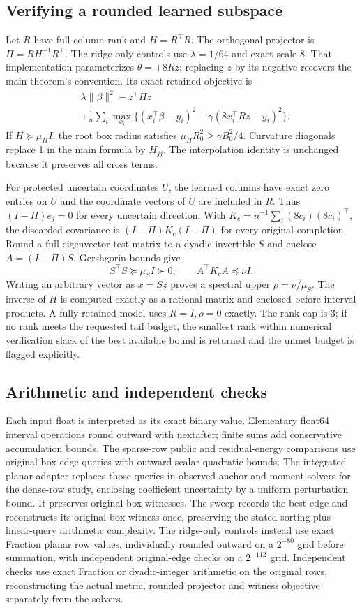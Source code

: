 \subsection{Verifying a rounded learned subspace}
Let $R$ have full column rank and $H=R^\top R$. The orthogonal projector is $\Pi=RH^{-1}R^\top$. The ridge-only controls use $\lambda=1/64$ and exact scale 8. That implementation parameterizes $\theta=+8Rz$; replacing $z$ by its negative recovers the main theorem's convention. Its exact retained objective is
\[
\begin{aligned}
 &\lambda\|\beta\|^2-z^\top Hz\\
 &+\frac1n\sum_i\max_{x_i}\{(x_i^\top\beta-y_i)^2-
              \gamma(8x_i^\top Rz-y_i)^2\}.
\end{aligned}
\]
If $H\succeq\mu_HI$, the root box radius satisfies $\mu_H R_0^2\geq\gamma B_0^2/4$. Curvature diagonals replace 1 in the main formula by $H_{jj}$. The interpolation identity is unchanged because it preserves all cross terms.

For protected uncertain coordinates $U$, the learned columns have exact zero entries on $U$ and the coordinate vectors of $U$ are included in $R$. Thus $(I-\Pi)e_j=0$ for every uncertain direction. With $K_c=n^{-1}\sum_i(8c_i)(8c_i)^\top$, the discarded covariance is $(I-\Pi)K_c(I-\Pi)$ for every original completion. Round a full eigenvector test matrix to a dyadic invertible $S$ and enclose $A=(I-\Pi)S$. Gershgorin bounds give
\[
 S^\top S\succeq\mu_SI\succ0,\qquad A^\top K_cA\preceq\nu I.
\]
Writing an arbitrary vector as $x=Sz$ proves a spectral upper $\rho=\nu/\mu_S$. The inverse of $H$ is computed exactly as a rational matrix and enclosed before interval products. A fully retained model uses $R=I,\rho=0$ exactly. The rank cap is 3; if no rank meets the requested tail budget, the smallest rank within numerical verification slack of the best available bound is returned and the unmet budget is flagged explicitly.

\subsection{Arithmetic and independent checks}
Each input float is interpreted as its exact binary value. Elementary float64 interval operations round outward with nextafter; finite sums add conservative accumulation bounds. The sparse-row public and residual-energy comparisons use original-box-edge queries with outward scalar-quadratic bounds. The integrated planar adapter replaces those queries in observed-anchor and moment solvers for the dense-row study, enclosing coefficient uncertainty by a uniform perturbation bound. It preserves original-box witnesses. The sweep records the best edge and reconstructs its original-box witness once, preserving the stated sorting-plus-linear-query arithmetic complexity. The ridge-only controls instead use exact Fraction planar row values, individually rounded outward on a $2^{-80}$ grid before summation, with independent original-edge checks on a $2^{-112}$ grid. Independent checks use exact Fraction or dyadic-integer arithmetic on the original rows, reconstructing the actual metric, rounded projector and witness objective separately from the solvers.

